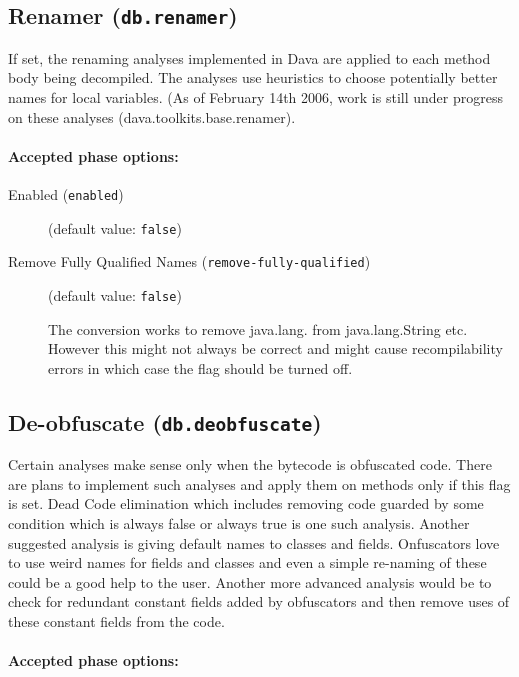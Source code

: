 \documentclass{article}
\begin{document}
\subsection{Renamer ({\tt db.renamer})}
If set, the renaming analyses implemented in Dava are applied to each method body being decompiled. The analyses use heuristics to choose potentially better names for local variables. (As of February 14th 2006, work is still under progress on these analyses (dava.toolkits.base.renamer).
					

\paragraph{Accepted phase options:} 

\begin{description}

\item[Enabled ({\tt enabled})]
(default value: {\tt false})






\item[Remove Fully Qualified Names ({\tt remove-fully-qualified})]
(default value: {\tt false})



The conversion works to remove java.lang. from java.lang.String etc.
                        However this might not always be correct and might cause recompilability errors in which case the flag
should be turned off.


\end{description}

\subsection{De-obfuscate ({\tt db.deobfuscate})}
Certain analyses make sense only when the bytecode is obfuscated code. 
There are plans to implement such analyses and apply them on methods only if this flag is set. 
Dead Code elimination which includes removing code guarded by some condition which is always false or always true is one such
analysis. Another suggested analysis is giving default names to classes and fields. Onfuscators love to use weird names
for fields and classes and even a simple re-naming of these could be a good help to the user. 
Another more advanced analysis would be to check for redundant constant fields added by obfuscators and then remove uses 
of these constant fields from the code.

\paragraph{Accepted phase options:} 
\end{document}
